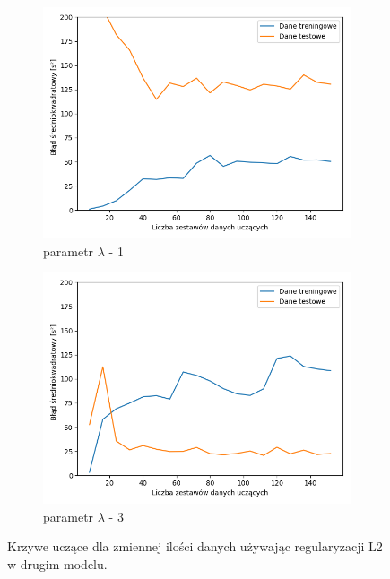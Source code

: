 \documentclass[12pt]{aghdpl}
\begin{document}
\begin{figure}[h]
		 	\begin{subfigure}{.5\linewidth}
		 		\includegraphics[width =\linewidth]{wykresy/6_regularyzacja/l2/regularyzacja_1_learning_curves.png}
		 		\caption{parametr $\lambda$ - 1}
		 	\end{subfigure}
		 	\begin{subfigure}{.5\linewidth}
		 		\includegraphics[width =\linewidth]{wykresy/6_regularyzacja/l2/regularyzacja_3_learning_curves.png}
		 		\caption{parametr $\lambda$ - 3}
		 	\end{subfigure}
	 	
 			\caption{Krzywe uczące dla zmiennej ilości danych używając regularyzacji L2 w drugim modelu.}
			\label{fig: drugi_model_przy_regularyzacji_l2_learning_curves}
		\end{figure}
		
\end{document}
